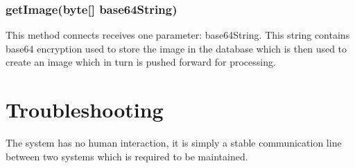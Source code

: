 \documentclass[a4paper,12pt]{report}
\begin{document}
\subsubsection{getImage(byte[] base64String)}
This method connects receives one parameter: base64String. This string contains base64 encryption used to store the image in the database which is then used to create an image which in turn is pushed forward for processing.
\pagebreak
\section{Troubleshooting}
The system has no human interaction, it is simply a stable communication line between two systems which is required to be maintained.
\end{document}
